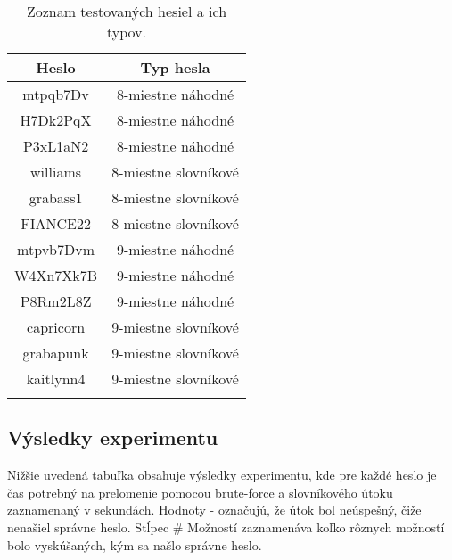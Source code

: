 \documentclass[12pt, twoside]{book}
\begin{document}
\begin{longtable}{|c|c|}
\hline
\textbf{Heslo} & \textbf{Typ hesla} \\ \hline
mtpqb7Dv & 8-miestne náhodné \\ \hline
H7Dk2PqX & 8-miestne náhodné \\ \hline
P3xL1aN2 & 8-miestne náhodné \\ \hline
williams & 8-miestne slovníkové \\ \hline
grabass1 & 8-miestne slovníkové \\ \hline
FIANCE22 & 8-miestne slovníkové \\ \hline
mtpvb7Dvm & 9-miestne náhodné \\ \hline
W4Xn7Xk7B & 9-miestne náhodné \\ \hline
P8Rm2L8Z & 9-miestne náhodné \\ \hline
capricorn & 9-miestne slovníkové \\ \hline
grabapunk & 9-miestne slovníkové \\ \hline
kaitlynn4 & 9-miestne slovníkové \\ \hline
\caption{Zoznam testovaných hesiel a ich typov.} %
\end{longtable}

\subsection{Výsledky experimentu}
Nižšie uvedená tabuľka obsahuje výsledky experimentu, kde pre každé heslo je čas potrebný na prelomenie pomocou brute-force a slovníkového útoku zaznamenaný v sekundách. Hodnoty - označujú, že útok bol neúspešný, čiže nenašiel správne heslo. Stĺpec \# Možností zaznamenáva koľko rôznych možností bolo vyskúšaných, kým sa našlo správne heslo.
\end{document}
